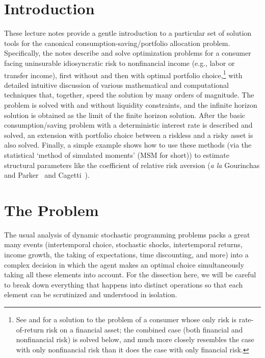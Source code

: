 \documentclass[titlepage, headings=optiontotocandhead]{econtex}
\begin{document}
\titlepagefinish

\thispagestyle{empty}
\ifpdf %
\tableofcontents {}\newpage
\fi
\newpage{}

\hypertarget{introduction}{}
\section{Introduction}\label{sec:introduction}

  These lecture notes provide a gentle introduction to a particular set of solution tools for the canonical consumption-saving/portfolio allocation problem.  Specifically, the notes describe and solve optimization problems for a consumer facing uninsurable idiosyncratic risk to nonfinancial income (e.g., labor or transfer income), first without and then with optimal portfolio choice,\footnote{See \cite{merton:restat} and \cite{samuelson:portfolio} for a solution to the problem of a consumer whose only risk is rate-of-return risk on a financial asset; the combined case (both financial and nonfinancial risk) is solved below, and much more closely resembles the case with only nonfinancial risk than it does the case with only financial risk.} with detailed intuitive discussion of various mathematical and computational techniques that, together, speed the solution by many orders of magnitude.  The problem is solved with and without liquidity constraints, and the infinite horizon solution is obtained as the limit of the finite horizon solution.  After the basic consumption/saving problem with a deterministic interest rate is described and solved, an extension with portfolio choice between a riskless and a risky asset is also solved.  Finally, a simple example shows how to use these methods (via the statistical `method of simulated moments' (MSM for short)) to estimate structural parameters like the coefficient of relative risk aversion (\textit{a la} Gourinchas and Parker~\citeyearpar{gpLifecycle} and Cagetti~\citeyearpar{cagettiWprofiles}).


\hypertarget{the-problem}{}
\section{The Problem}\label{sec:the-problem}

The usual analysis of dynamic stochastic programming problems packs a great many events (intertemporal choice, stochastic shocks, intertemporal returns, income growth, the taking of expectations, time discounting, and more) into a complex decision in which the agent makes an optimal choice simultaneously taking all these elements into account. For the dissection here, we will be careful to break down everything that happens into distinct operations so that each element can be scrutinized and understood in isolation.
\end{document}
